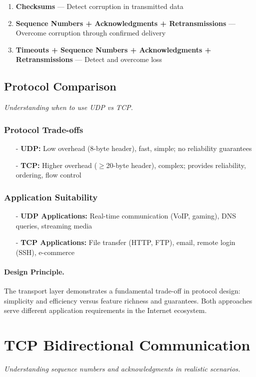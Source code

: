\documentclass[../../compsys.tex]{subfiles}
\begin{document}
\begin{enumerate}
  \item \textbf{Checksums} — Detect corruption in transmitted data
  \item \textbf{Sequence Numbers + Acknowledgments + Retransmissions} — Overcome corruption through confirmed delivery
  \item \textbf{Timeouts + Sequence Numbers + Acknowledgments + Retransmissions} — Detect and overcome loss
\end{enumerate}

\subsection{Protocol Comparison}
\textit{Understanding when to use UDP vs TCP.}

\subsubsection{Protocol Trade-offs}
\begin{itemize}
  \item[-] \textbf{UDP:} Low overhead (8-byte header), fast, simple; no reliability guarantees
  \item[-] \textbf{TCP:} Higher overhead ($\geq$20-byte header), complex; provides reliability, ordering, flow control
\end{itemize}

\subsubsection{Application Suitability}
\begin{itemize}
  \item[-] \textbf{UDP Applications:} Real-time communication (VoIP, gaming), DNS queries, streaming media
  \item[-] \textbf{TCP Applications:} File transfer (HTTP, FTP), email, remote login (SSH), e-commerce
\end{itemize}

\paragraph{Design Principle.} The transport layer demonstrates a fundamental trade-off in protocol design: simplicity and efficiency versus feature richness and guarantees. Both approaches serve different application requirements in the Internet ecosystem.

\section{TCP Bidirectional Communication}
\textit{Understanding sequence numbers and acknowledgments in realistic scenarios.}
\end{document}
